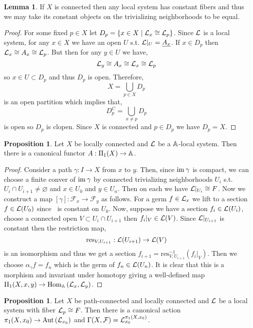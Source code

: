 \documentclass[12pt]{extarticle}
\newcommand{\catHom}[3]{\mathrm{Hom}_{#1}\left( #2, #3 \right)}
\theoremstyle{definition}
\newtheorem{lemma}[theorem]{Lemma}
\newtheorem{proposition}[theorem]{Proposition}
\newcommand{\res}{\mathrm{res}}
\newcommand{\F}{\mathcal{F}}
\newcommand{\Aut}[1]{\mathrm{Aut}\left(#1 \right)}
\begin{document}
\begin{lemma}
If $X$ is connected then any local system has constant fibers and thus we may take its constant objects on the trivializing neighborhoods to be equal.
\end{lemma}

\begin{proof}
For some fixed $p \in X$ let $D_p = \{ x \in X \mid \mathcal{L}_x \cong \mathcal{L}_p \}$. Since $\mathcal{L}$ is a local system, for any $x \in X$ we have an open $U$ s.t. $\mathcal{L} |_U = \underline{A_x}$. If $x \in D_p$ then $\mathcal{L}_x \cong A_x \cong \mathcal{L}_p$. But then for any $y \in U$ we have,
\[ \mathcal{L}_y \cong A_x \cong \mathcal{L}_x \cong \mathcal{L}_p \]
so $x \in U \subset D_p$ and thus $D_p$ is open. Therefore,
\[ X = \bigcup_{p \in X} D_p \]
is an open partition which implies that,
\[ D_p^C = \bigcup_{x \neq p} D_p \]
is open so $D_p$ is clopen. Since $X$ is connected and $p \in D_p$ we have $D_p = X$. 
\end{proof}


\begin{proposition}
Let $X$ be locally connected and $\mathcal{L}$ be a $\mathbb{A}$-local system. Then there is a canonical functor $A : \Pi_1(X) \to \mathbb{A}$. 
\end{proposition}

\begin{proof}
Consider a path $\gamma : I \to X$ from $x$ to $y$. Then, since $\mathrm{im} \:{\gamma}$ is compact, we can choose a finite conver of $\mathrm{im} \:{\gamma}$ by connected trivializing neighborhoods $U_i$ s.t. $U_i \cap U_{i+1} \neq \varnothing$ and $x \in U_0$ and $y \in U_n$. Then on each we have $\mathcal{L} |_{U_i} \cong F$. Now we construct a map $[\gamma] : \F_{x} \to \F_{y}$ as follows. For a germ $f \in \mathcal{L}_{x}$ we lift to a section $f \in \mathcal{L}(U_0)$ since $\:$ is constant on $U_0$. Now, suppose we have a section $f_i \in \mathcal{L}(U_i)$, choose a connected open $V \subset U_i \cap U_{i+1}$ then $f_i |_V \in \mathcal{L}(V)$. Since $\mathcal{L} |_{U_{i+1}}$ is constant then the restriction map,
\[ \res_{V, U_{i+1}} : \L(U_{i+1}) \to \L(V) \]
is an isomorphism and thus we get a section $f_{i+1} = \res_{V, U_{i+1}}^{-1}(f_i |_V)$. Then we choose $\alpha_\gamma f = f_n$ which is the germ of $f_n \in \mathcal{L}(U_n)$. It is clear that this is a morphism and invariant under homotopy giving a well-defined map $\Pi_1(X, x, y) \to \catHom{\A}{\L_{x}}{\L_{y}}$. 
\end{proof}

\begin{proposition}
Let $X$ be path-connected and locally connected and $\mathcal{L}$ be a local system with fiber $\mathcal{L}_p \cong F$. Then there is a canonical action $\pi_1(X, x_0) \to \Aut{\L_{x_0}}$ and $\Gamma(X, \F) = \L_{x_0}^{\pi_1(X, x_0)}$.
\end{proposition}
\end{document}
